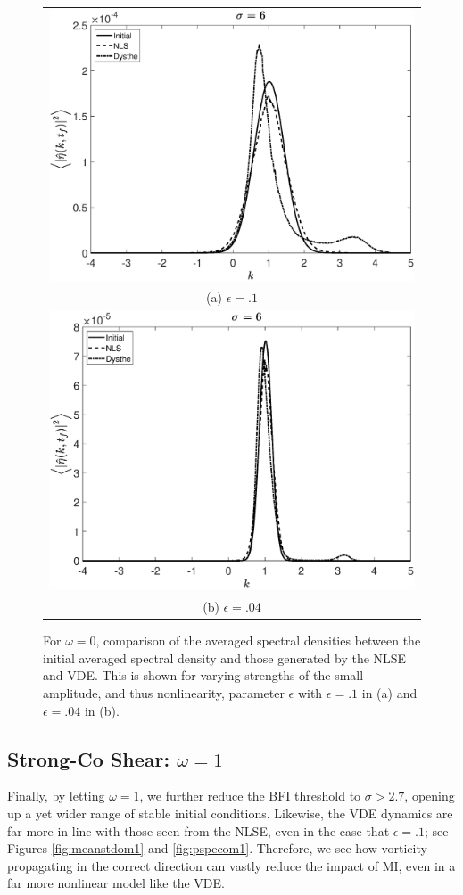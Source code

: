 \documentclass[a4paper,11pt]{article}
\begin{document}
\begin{figure}[!ht]
\centering
\begin{tabular}{c}
\includegraphics[width=.65\textwidth]{omega0_ep0pt1_width6} \\
(a) $\epsilon=.1$\\
\includegraphics[width=.65\textwidth]{omega0_ep0pt04_width6}\\
(b) $\epsilon=.04$ 
\end{tabular}
\caption{For $\omega=0$, comparison of the averaged spectral densities between the initial averaged spectral density and those generated by the NLSE and VDE.  This is shown for varying strengths of the small amplitude, and thus nonlinearity, parameter $\epsilon$ with $\epsilon=.1$ in (a) and $\epsilon=.04$ in (b).}
\label{fig:pspecom0}
\end{figure}

\subsection*{Strong-Co Shear: $\omega = 1$}

Finally, by letting $\omega=1$, we further reduce the BFI threshold to $\sigma > 2.7$, opening up a yet wider range of stable initial conditions.  Likewise, the VDE dynamics are far more in line with those seen from the NLSE, even in the case that $\epsilon=.1$; see Figures \ref{fig:meanstdom1} and \ref{fig:pspecom1}.  Therefore, we see how vorticity propagating in the correct direction can vastly reduce the impact of MI, even in a far more nonlinear model like the VDE.  
\end{document}
